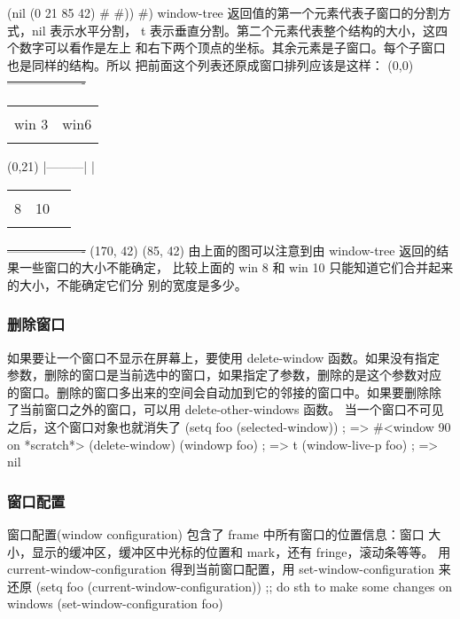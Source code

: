 \documentclass[11pt]{ctexart}
\begin{document}
{{{{(nil (0 21 85 42) \#<win 8> \#<win 10>))
\#<win 6>)
window-tree 返回值的第一个元素代表子窗口的分割方式，nil 表示水平分割， t 表示垂直分割。第二个元素代表整个结构的大小，这四个数字可以看作是左上 和右下两个顶点的坐标。其余元素是子窗口。每个子窗口也是同样的结构。所以 把前面这个列表还原成窗口排列应该是这样：
(0,0) \sout{-------------------}
\begin{center}
\begin{tabular}{ll}
 & \\
win 3 & win6\\
 & \\
\end{tabular}
\end{center}
(0,21) |---------|         |
\begin{center}
\begin{tabular}{rrl}
 &  & \\
8 & 10 & \\
 &  & \\
\end{tabular}
\end{center}
\sout{-------------------} (170, 42)
(85, 42)
由上面的图可以注意到由 window-tree 返回的结果一些窗口的大小不能确定， 比较上面的 win 8 和 win 10 只能知道它们合并起来的大小，不能确定它们分 别的宽度是多少。
\subsubsection{删除窗口}
\label{sec:org190a76f}
如果要让一个窗口不显示在屏幕上，要使用 delete-window 函数。如果没有指定 参数，删除的窗口是当前选中的窗口，如果指定了参数，删除的是这个参数对应 的窗口。删除的窗口多出来的空间会自动加到它的邻接的窗口中。如果要删除除 了当前窗口之外的窗口，可以用 delete-other-windows 函数。
当一个窗口不可见之后，这个窗口对象也就消失了
(setq foo (selected-window))            ; => \#<window 90 on *scratch*>
(delete-window)
(windowp foo)                           ; => t
(window-live-p foo)                     ; => nil
\subsubsection{窗口配置}
\label{sec:orge1084a3}
窗口配置(window configuration) 包含了 frame 中所有窗口的位置信息：窗口 大小，显示的缓冲区，缓冲区中光标的位置和 mark，还有 fringe，滚动条等等。 用 current-window-configuration 得到当前窗口配置，用 set-window-configuration 来还原
(setq foo (current-window-configuration))
;; do sth to make some changes on windows
(set-window-configuration foo)
}}}}
\end{document}
